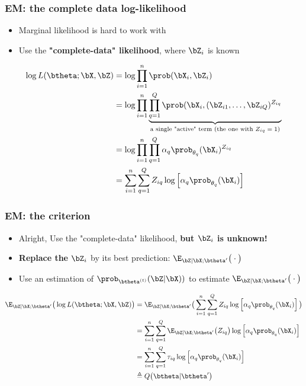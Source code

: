 \documentclass{beamer}\usepackage[]{graphicx}\usepackage[]{color}
\begin{document}
\begin{frame}
  \frametitle{EM: the complete data log-likelihood}

  \begin{itemize}
    \item Marginal likelihood is hard to work with
    \item Use the \alert{\bf "complete-data" likelihood}, where $\bZ_i$ is known
  \end{itemize}
  \begin{align*}
    \log L (\btheta;\bX, \bZ) & = \log \prod_{i=1}^n \prob(\bX_i, \bZ_i) \\
    & = \log \prod_{i=1}^n \underbrace{\prod_{q=1}^Q \prob(\bX_i, (\bZ_{i1}, \dots, \bZ_{iQ})^{Z_{iq}}}_{\text{a single "active" term (the one with $Z_{iq}=1$)}} \\
    & = \log \prod_{i=1}^n \prod_{q=1}^Q \alpha_q \prob_{\theta_q}(\bX_i)^{Z_{iq}} \\
    & = \sum_{i=1}^n \sum_{q=1}^Q Z_{iq} \log\left[\alpha_q \prob_{\theta_q}(\bX_i)\right]\\
  \end{align*}

\end{frame}

\begin{frame}
  \frametitle{EM: the criterion }

  \begin{itemize}
    \item Alright, Use the "complete-data" likelihood, \alert{\bf but $\bZ_i$ is unknown!}
    \item \alert{\bf Replace the $\bZ_i$} by its best prediction: $\E_{\bZ|\bX; \btheta'}\big(\cdot \big)$
    \item Use an estimation of $\prob_{\btheta^{(t)}}(\bZ|\bX))$ to estimate $\E_{\bZ|\bX; \btheta'}\big(\cdot \big)$
  \end{itemize}

  \begin{align*}
    \E_{\bZ|\bX;\btheta'}\big(\log L (\btheta;\bX, \bZ)\big) & = 
    \E_{\bZ|\bX;\btheta'}\big(\sum_{i=1}^n \sum_{q=1}^Q Z_{iq} \log\left[\alpha_q \prob_{\theta_q}(\bX_i)\right]\big) \\
    & = \sum_{i=1}^n \sum_{q=1}^Q \E_{\bZ|\bX;\btheta'}\big(Z_{iq}\big) \log\left[\alpha_q \prob_{\theta_q}(\bX_i)\right] \\
    & = \sum_{i=1}^n \sum_{q=1}^Q \tau_{iq} \log\left[\alpha_q \prob_{\theta_q}(\bX_i)\right] \\
    & \triangleq Q \big(\btheta | \btheta' \big)
  \end{align*}

\end{frame}
\end{document}
